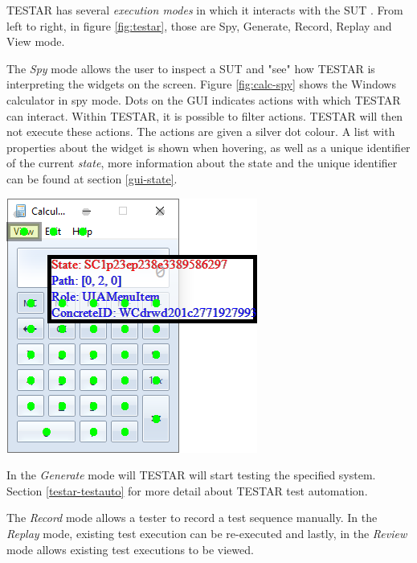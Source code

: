 TESTAR has several \emph{execution modes} in which it interacts with the SUT \cite{testar-manual}. From left to right, in figure \ref{fig:testar}, those are Spy, Generate, Record, Replay and View mode. 

The \emph{Spy} mode allows the user to inspect a SUT and "see" how TESTAR is interpreting the widgets on the screen. Figure \ref{fig:calc-spy} shows the Windows calculator in spy mode. Dots on the GUI indicates actions with which TESTAR can interact. Within TESTAR, it is possible to filter actions. TESTAR will then not execute these actions. The actions are given a silver dot colour. A list with properties about the widget is shown when hovering, as well as a unique identifier of the current \emph{state}, more information about the state and the unique identifier can be found at section \ref{gui-state}.\par

\begingroup
\captionsetup{type=figure}
\includegraphics{pics/calc-state.png}
\label{fig:calc-spy}
\endgroup

In the \emph{Generate} mode will TESTAR will start testing the specified system. Section \ref{testar-testauto} for more detail about TESTAR test automation.

The \emph{Record} mode allows a tester to record a test sequence manually. In the \emph{Replay} mode, existing test execution can be re-executed and lastly, in the \emph{Review} mode allows existing test executions to be viewed.

